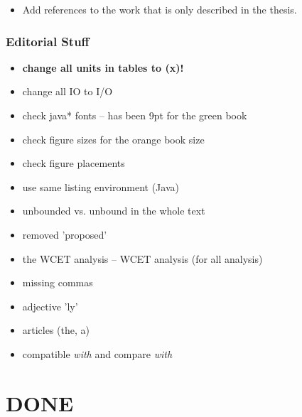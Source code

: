 \begin{itemize}
  \item Add references to the work that is only described in the
      thesis.
\end{itemize}

\subsection{Editorial Stuff}

\begin{itemize}
  \item \textbf{change all units in tables to (x)!}
  \item change all IO to I/O
  \item check java* fonts -- has been 9pt for the green book
  \item check figure sizes for the orange book size
  \item check figure placements
  \item use same listing environment (Java)
  \item unbounded vs. unbound in the whole text
  \item removed 'proposed'
  \item the WCET analysis -- WCET analysis (for all analysis)
  \item missing commas
  \item adjective 'ly'
  \item articles (the, a)
  \item compatible \emph{with} and compare \emph{with}
\end{itemize}


\chapter{DONE}


